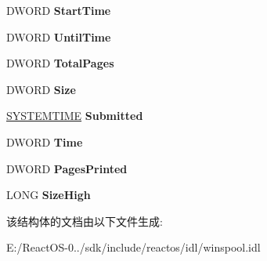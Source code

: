 \begin{DoxyCompactItemize}
\mbox{\label{struct___w_i_n_s_p_o_o_l___j_o_b___i_n_f_o__4_a574b90ca1a4757ef51549c8d85a7f707}} 
D\+W\+O\+RD {\bfseries Start\+Time}
\item 
\mbox{\label{struct___w_i_n_s_p_o_o_l___j_o_b___i_n_f_o__4_a157ea9296062ed15eed0f9395ab168c0}} 
D\+W\+O\+RD {\bfseries Until\+Time}
\item 
\mbox{\label{struct___w_i_n_s_p_o_o_l___j_o_b___i_n_f_o__4_ad48b535a8d175eaba3eae28dcfb5e093}} 
D\+W\+O\+RD {\bfseries Total\+Pages}
\item 
\mbox{\label{struct___w_i_n_s_p_o_o_l___j_o_b___i_n_f_o__4_ad3bac3c9f9459d484c38b3c7c54d5e9e}} 
D\+W\+O\+RD {\bfseries Size}
\item 
\mbox{\label{struct___w_i_n_s_p_o_o_l___j_o_b___i_n_f_o__4_abff3172dc3c4923a4a81779829d6f251}} 
\hyperlink{struct___s_y_s_t_e_m_t_i_m_e}{S\+Y\+S\+T\+E\+M\+T\+I\+ME} {\bfseries Submitted}
\item 
\mbox{\label{struct___w_i_n_s_p_o_o_l___j_o_b___i_n_f_o__4_a40afeaf9be237139e4cf15c62c4fe92e}} 
D\+W\+O\+RD {\bfseries Time}
\item 
\mbox{\label{struct___w_i_n_s_p_o_o_l___j_o_b___i_n_f_o__4_a1f741344e6f9f45a21825081a77a836a}} 
D\+W\+O\+RD {\bfseries Pages\+Printed}
\item 
\mbox{\label{struct___w_i_n_s_p_o_o_l___j_o_b___i_n_f_o__4_a7b391ddd9842c551cefac85e554f7812}} 
L\+O\+NG {\bfseries Size\+High}
\end{DoxyCompactItemize}


该结构体的文档由以下文件生成\+:\begin{DoxyCompactItemize}
\item 
E\+:/\+React\+O\+S-\/0../sdk/include/reactos/idl/winspool.\+idl\end{DoxyCompactItemize}
